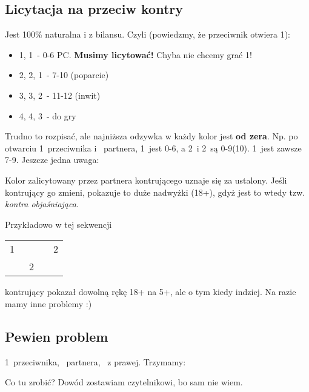 \documentclass[12pt, a4paper]{article}
\begin{document}
    \subsection{Licytacja na przeciw kontry}
    Jest 100\% naturalna i z bilansu. Czyli (powiedzmy, że przeciwnik otwiera 1\diams):
    \begin{itemize}
        \item 1\hearts, 1\spades\ - 0-6 PC. \textbf{Musimy licytować!} Chyba nie chcemy grać 1\diams\dbl!
        \item 2\hearts, 2\spades, 1\nt\ - 7-10 (poparcie)
        \item 3\hearts, 3\spades, 2\nt\ - 11-12 (inwit)
        \item 4\hearts, 4\spades, 3\nt\ - do gry
    \end{itemize} 
    Trudno to rozpisać, ale najniższa odzywka w każdy kolor jest \textbf{od zera}. Np. po otwarciu 1\hearts\ 
    przeciwnika i \dbl\ partnera, 1\spades\ jest 0-6, a 2\clubs\ i 2\diams\ są 0-9(10).
    1\nt\ jest zawsze 7-9. Jeszcze jedna uwaga:
    \begin{formal}
        Kolor zalicytowany przez partnera kontrującego uznaje się za ustalony. Jeśli kontrujący go zmieni,
        pokazuje to duże nadwyżki (18+), gdyż jest to wtedy tzw. \emph{kontra objaśniająca}.
    \end{formal}
    Przykładowo w tej sekwencji
    \begin{table}[h!]
        \centering
        \begin{tabular}{cccc}
            1\spades\ & \dbl & \pass & 2\clubs \\
            \pass & 2\diams
        \end{tabular}
    \end{table}
    kontrujący pokazał dowolną rękę 18+ na 5+\diams, ale o tym kiedy indziej. Na razie mamy inne problemy :)
    
    \subsection{Pewien problem}
    1\hearts\ przeciwnika, \dbl\ partnera, \pass\ z prawej. Trzymamy:
    \begin{center}
    \end{center}
    Co tu zrobić? Dowód zostawiam czytelnikowi, bo sam nie wiem. 
\end{document}
